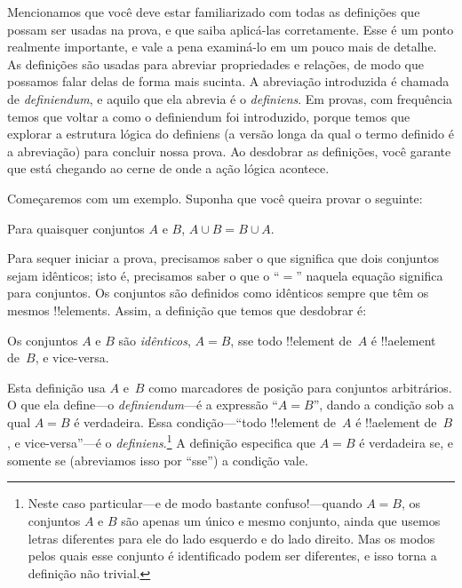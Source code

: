 \documentclass[../../../include/open-logic-section]{subfiles}
\begin{document}


Mencionamos que você deve estar familiarizado com todas as definições que possam
ser usadas na prova, e que saiba aplicá-las corretamente. Esse é um
ponto realmente importante, e vale a pena examiná-lo em um pouco mais de
detalhe. As definições são usadas para abreviar propriedades e relações, de modo que
possamos falar delas de forma mais sucinta. A abreviação introduzida é
chamada de \emph{definiendum}, e aquilo que ela abrevia é o
\emph{definiens}.  Em provas, com frequência temos que voltar a como o
definiendum foi introduzido, porque temos que explorar a estrutura
lógica do definiens (a versão longa da qual o termo definido
é a abreviação) para concluir nossa prova.  Ao desdobrar as
definições, você garante que está chegando ao cerne de onde
a ação lógica acontece.

Começaremos com um exemplo. Suponha que você queira provar o seguinte:

\begin{prop}
Para quaisquer conjuntos $A$ e $B$, $A \cup B = B \cup A$.
\end{prop}

Para sequer iniciar a prova, precisamos saber o que significa que
dois conjuntos sejam idênticos; isto é, precisamos saber o que o ``$=$'' naquela
equação significa para conjuntos.  Os conjuntos são definidos como idênticos
sempre que têm os mesmos !!{element}s.  Assim, a definição que temos
que desdobrar é:

\begin{defn}
Os conjuntos $A$ e $B$ são \emph{idênticos}, $A = B$, sse todo !!{element}
de~$A$ é !!a{element} de~$B$, e vice-versa.
\end{defn}

Esta definição usa $A$ e~$B$ como marcadores de posição para conjuntos
arbitrários. O que ela define---o \emph{definiendum}---é a expressão
``$A = B$'', dando a condição sob a qual $A = B$ é verdadeira.  Essa
condição---``todo !!{element} de~$A$ é !!a{element} de~$B$, e
vice-versa''---é o \emph{definiens}.\footnote{Neste caso
  particular---e de modo bastante confuso!---quando $A = B$, os conjuntos $A$ e $B$
  são apenas um único e mesmo conjunto, ainda que usemos letras diferentes
  para ele do lado esquerdo e do lado direito.  Mas os modos pelos quais esse
  conjunto é identificado podem ser diferentes, e isso torna a definição
  não trivial.} A definição especifica que $A = B$ é verdadeira se, e
somente se (abreviamos isso por ``sse'') a condição vale.
\end{document}
